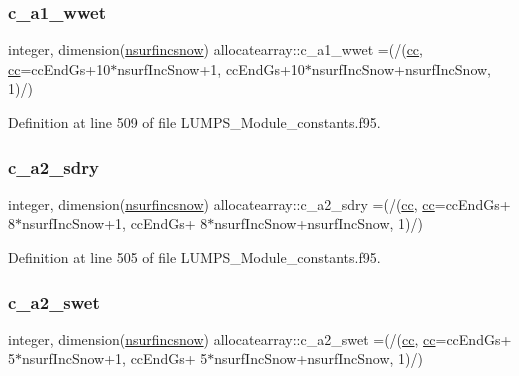 \subsubsection{\texorpdfstring{c\+\_\+a1\+\_\+wwet}{c\_a1\_wwet}}
{\footnotesize\ttfamily integer, dimension(\hyperlink{namespaceallocatearray_af4d113f332b6759cfa22271140c9162d}{nsurfincsnow}) allocatearray\+::c\+\_\+a1\+\_\+wwet =(/(\hyperlink{namespaceallocatearray_ac863c81704eb507dee10f5e10741e10c}{cc}, \hyperlink{namespaceallocatearray_ac863c81704eb507dee10f5e10741e10c}{cc}=cc\+End\+Gs+10$\ast$nsurf\+Inc\+Snow+1, cc\+End\+Gs+10$\ast$nsurf\+Inc\+Snow+nsurf\+Inc\+Snow, 1)/)}



Definition at line 509 of file L\+U\+M\+P\+S\+\_\+\+Module\+\_\+constants.\+f95.

\mbox{\label{namespaceallocatearray_a3ab2ec26537a6dfb7dd41c567553aa9e}} 
\subsubsection{\texorpdfstring{c\+\_\+a2\+\_\+sdry}{c\_a2\_sdry}}
{\footnotesize\ttfamily integer, dimension(\hyperlink{namespaceallocatearray_af4d113f332b6759cfa22271140c9162d}{nsurfincsnow}) allocatearray\+::c\+\_\+a2\+\_\+sdry =(/(\hyperlink{namespaceallocatearray_ac863c81704eb507dee10f5e10741e10c}{cc}, \hyperlink{namespaceallocatearray_ac863c81704eb507dee10f5e10741e10c}{cc}=cc\+End\+Gs+ 8$\ast$nsurf\+Inc\+Snow+1, cc\+End\+Gs+ 8$\ast$nsurf\+Inc\+Snow+nsurf\+Inc\+Snow, 1)/)}



Definition at line 505 of file L\+U\+M\+P\+S\+\_\+\+Module\+\_\+constants.\+f95.

\mbox{\label{namespaceallocatearray_a23f88d3f042915af31a77a23e34ac954}} 
\subsubsection{\texorpdfstring{c\+\_\+a2\+\_\+swet}{c\_a2\_swet}}
{\footnotesize\ttfamily integer, dimension(\hyperlink{namespaceallocatearray_af4d113f332b6759cfa22271140c9162d}{nsurfincsnow}) allocatearray\+::c\+\_\+a2\+\_\+swet =(/(\hyperlink{namespaceallocatearray_ac863c81704eb507dee10f5e10741e10c}{cc}, \hyperlink{namespaceallocatearray_ac863c81704eb507dee10f5e10741e10c}{cc}=cc\+End\+Gs+ 5$\ast$nsurf\+Inc\+Snow+1, cc\+End\+Gs+ 5$\ast$nsurf\+Inc\+Snow+nsurf\+Inc\+Snow, 1)/)}



